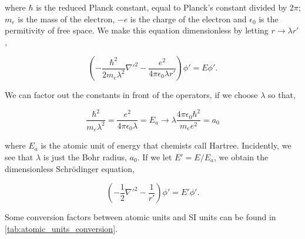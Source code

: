         where $\hbar$ is the reduced Planck constant, equal to Planck's constant divided by 
        $2\pi$; $m_e$ is the mass of the electron, $-e$ is the charge of the electron and 
        $\epsilon_0$ is the permitivity of free space. We make this equation dimensionless by 
        letting $r \to \lambda r'$,

        \begin{equation}
            \left(-\frac{\hbar^2}{2m_e\lambda^2}\nabla'^2 - \frac{e^2}{4\pi\epsilon_0\lambda r'} \right)
            \phi' = E\phi'.
        \end{equation}

        We can factor out the constants in front of the operators, if we choose $\lambda$ so that,

        \begin{equation}
            \frac{\hbar^2}{m_e\lambda^2} = \frac{e^2}{4\pi \epsilon_0 \lambda} = E_a
            \to \lambda \frac{4\pi\epsilon_0\hbar^2}{m_e e^2} = a_0
        \end{equation}

        where $E_a$ is the atomic unit of energy that chemists call Hartree. Incidently,
        we see that $\lambda$ is just the Bohr radius, $a_0$. If we let $E' = E/E_a$, we 
        obtain the dimensionless Schrödinger equation,

        \begin{equation}
            \left(-\frac{1}{2}\nabla'^2 - \frac{1}{r'} \right) \phi' = E'\phi'.
        \end{equation}

        Some conversion factors between atomic units and SI units can be found in
        \autoref{tab:atomic_units_conversion}.

